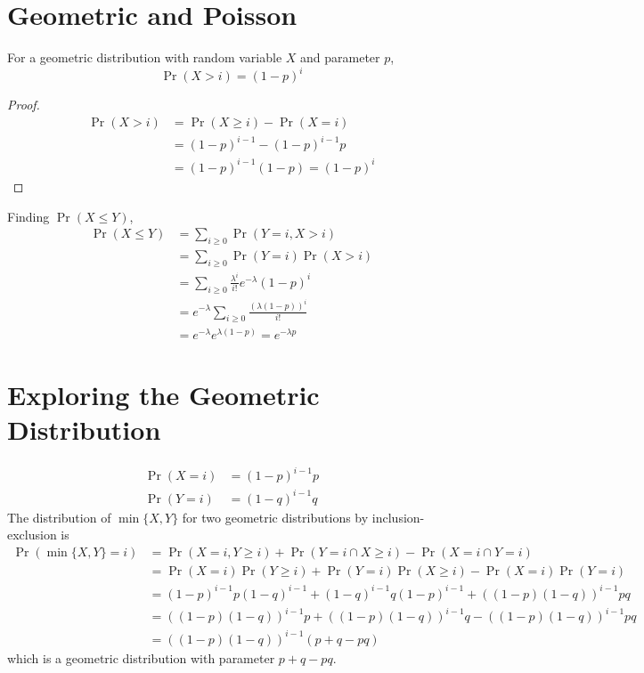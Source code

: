 \documentclass{article}
\begin{document}
\section{Geometric and Poisson}

\begin{lemma}
    For a geometric distribution with random variable \(X\) and parameter \(p\),
    \begin{equation}
        \Pr(X > i) = (1 - p)^i
    \end{equation}
\end{lemma}
\begin{proof}
    \begin{align}
        \Pr(X > i) &= \Pr(X \geqslant i) - \Pr(X = i) \\
        &= (1 - p)^{i - 1} - (1 - p)^{i - 1} p \\
        &= (1 - p)^{i - 1} (1 - p) = (1 - p)^i
    \end{align}
\end{proof}
Finding \(\Pr(X \leqslant Y)\),
\begin{align}
    \Pr(X \leqslant Y) &= \sum_{i \geqslant 0} \Pr(Y = i, X > i) \\
    &= \sum_{i \geqslant 0} \Pr(Y = i) \Pr(X > i) \\
    &= \sum_{i \geqslant 0} \frac{\lambda^i}{i!} e^{-\lambda} (1 - p)^i \\
    &= e^{-\lambda} \sum_{i \geqslant 0} \frac{(\lambda (1 - p))^i}{i!} \\
    &= e^{-\lambda} e^{\lambda (1 - p)} = e^{-\lambda p}
\end{align}

\section{Exploring the Geometric Distribution}

\begin{align}
    \Pr(X = i) &= (1 - p)^{i - 1} p \\
    \Pr(Y = i) &= (1 - q)^{i - 1} q
\end{align}
The distribution of \(\min\{X, Y\}\) for two geometric distributions by inclusion-exclusion is
\begin{align}
    \Pr(\min\{X, Y\} = i) &= \Pr(X = i, Y \geqslant i) + \Pr(Y = i \cap X \geqslant i) - \Pr(X = i \cap Y = i) \\
    &= \Pr(X = i) \Pr(Y \geqslant i) + \Pr(Y = i) \Pr(X \geqslant i) - \Pr(X = i) \Pr(Y = i) \\
    &= (1 - p)^{i - 1} p (1 - q)^{i - 1} + (1 - q)^{i - 1} q (1 - p)^{i - 1} + ((1 - p) (1 - q))^{i - 1} pq \\
    &= ((1 - p) (1 - q))^{i - 1} p + ((1 - p) (1 - q))^{i - 1} q - ((1 - p) (1 - q))^{i - 1} pq \\
    &= ((1 - p) (1 - q))^{i - 1} (p + q - pq)
\end{align}
which is a geometric distribution with parameter \(p + q - pq\).
\end{document}
